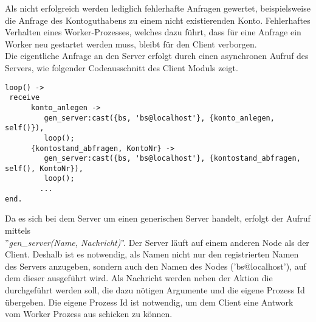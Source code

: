 Als nicht erfolgreich werden lediglich fehlerhafte Anfragen gewertet, beispielsweise die Anfrage des Kontoguthabens zu einem nicht existierenden Konto. Fehlerhaftes Verhalten eines Worker-Prozesses, welches dazu führt, dass für eine Anfrage ein Worker neu gestartet werden muss, bleibt für den Client verborgen.\\
Die eigentliche Anfrage an den Server erfolgt durch einen asynchronen Aufruf des Servers, wie folgender Codeausschnitt des Client Moduls zeigt.
\begin{lstlisting} 
loop() ->
 receive
      konto_anlegen ->
         gen_server:cast({bs, 'bs@localhost'}, {konto_anlegen, self()}),
         loop();
      {kontostand_abfragen, KontoNr} ->
         gen_server:cast({bs, 'bs@localhost'}, {kontostand_abfragen, self(), KontoNr}),
         loop();
		...
end.
\end{lstlisting}
Da es sich bei dem Server um einen generischen Server handelt, erfolgt der Aufruf mittels \\ ''\textit{gen\_server(Name, Nachricht)}''. Der Server läuft auf einem anderen Node als der Client. Deshalb ist es notwendig, als Namen nicht nur den registrierten Namen des Servers anzugeben, sondern auch den Namen des Nodes ('bs@localhost'), auf dem dieser ausgeführt wird. Als Nachricht werden neben der Aktion die durchgeführt werden soll, die dazu nötigen Argumente und die eigene Prozess Id übergeben. Die eigene Prozess Id ist notwendig, um dem Client eine Antwork vom Worker Prozess aus schicken zu können.